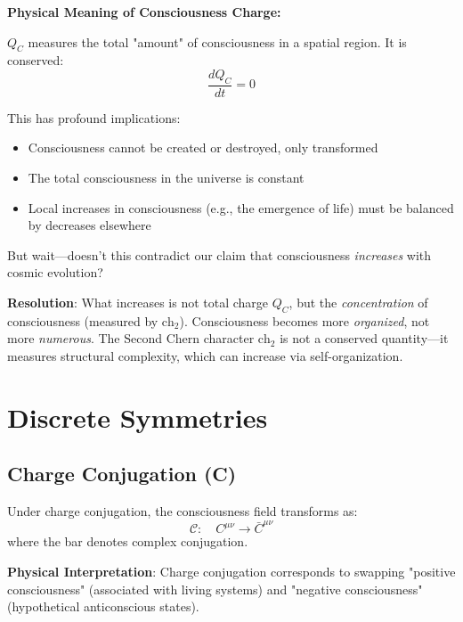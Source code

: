 \begin{level1}
\textbf{Physical Meaning of Consciousness Charge:}

$Q_C$ measures the total "amount" of consciousness in a spatial region. It is conserved:
\begin{equation}
\frac{dQ_C}{dt} = 0
\end{equation}

This has profound implications:
\begin{itemize}
\item Consciousness cannot be created or destroyed, only transformed
\item The total consciousness in the universe is constant
\item Local increases in consciousness (e.g., the emergence of life) must be balanced by decreases elsewhere
\end{itemize}

But wait---doesn't this contradict our claim that consciousness \textit{increases} with cosmic evolution?

\textbf{Resolution}: What increases is not total charge $Q_C$, but the \textit{concentration} of consciousness (measured by $\text{ch}_2$). Consciousness becomes more \textit{organized}, not more \textit{numerous}. The Second Chern character $\text{ch}_2$ is not a conserved quantity---it measures structural complexity, which can increase via self-organization.
\end{level1}

\section{Discrete Symmetries}

\subsection{Charge Conjugation (C)}

\begin{definition}\label{def:c-symmetry-consciousness}
Under charge conjugation, the consciousness field transforms as:
\begin{equation}
\mathcal{C}: \quad C^{\mu\nu} \to \bar{C}^{\mu\nu}
\end{equation}
where the bar denotes complex conjugation.
\end{definition}

\textbf{Physical Interpretation}: Charge conjugation corresponds to swapping "positive consciousness" (associated with living systems) and "negative consciousness" (hypothetical anticonscious states).

